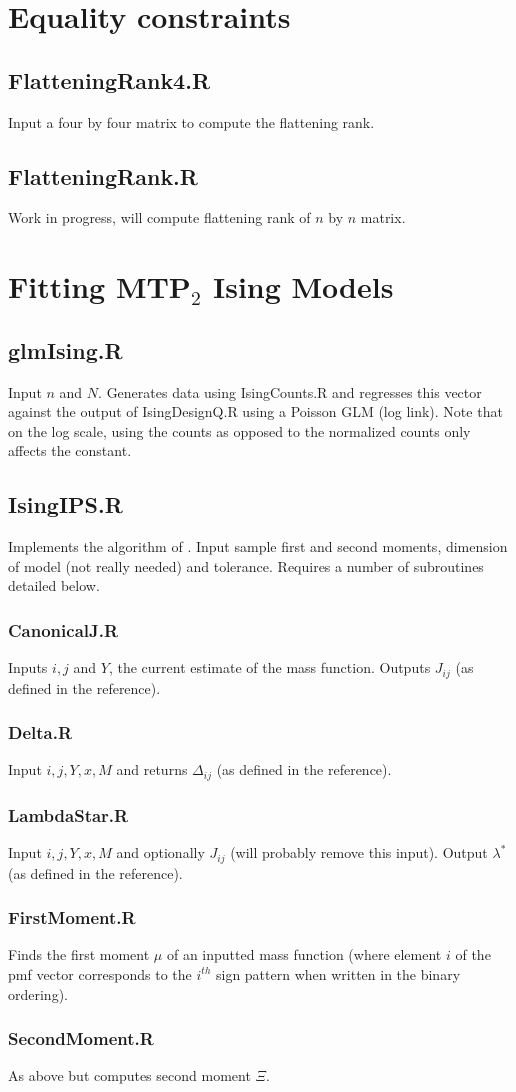 \documentclass{article}
\theoremstyle{plain}
\theoremstyle{definition}
\theoremstyle{plain} %
\begin{document}
\section{Equality constraints}
\subsection{FlatteningRank4.R}
Input a four by four matrix to compute the flattening rank.
\subsection{FlatteningRank.R}
Work in progress, will compute flattening rank of $n$ by $n$ matrix.
\section{Fitting MTP$_2$ Ising Models}
\subsection{glmIsing.R}
Input $n$ and $N$. Generates data using IsingCounts.R and regresses this vector against the output of IsingDesignQ.R using a Poisson GLM (log link). Note that on the log scale, using the counts as opposed to the normalized counts only affects the constant.
\subsection{IsingIPS.R}
Implements the algorithm of \cite{lauritzen2019total}. Input sample first and second moments, dimension of model (not really needed) and tolerance. Requires a number of subroutines detailed below.
\subsubsection{CanonicalJ.R}
Inputs $i,j$ and $Y$, the current estimate of the mass function. Outputs $J_{ij}$ (as defined in the reference).
\subsubsection{Delta.R}
Input $i,j,Y,x,M$ and returns $\Delta_{ij}$ (as defined in the reference).
\subsubsection{LambdaStar.R}
Input $i,j,Y,x,M$ and optionally $J_{ij}$ (will probably remove this input). Output $\lambda^*$ (as defined in the reference).
\subsubsection{FirstMoment.R}
Finds the first moment $\mu$ of an inputted mass function (where element $i$ of the pmf vector corresponds to the $i^{th}$ sign pattern when written in the binary ordering).
\subsubsection{SecondMoment.R}
As above but computes second moment $\Xi$.



\end{document}
